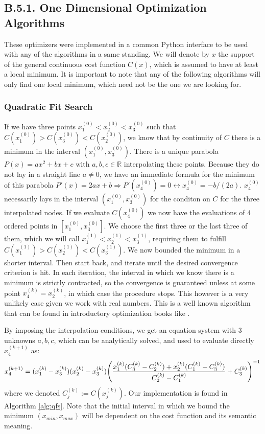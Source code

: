 \documentclass[11pt, a4paper, twoside]{article} %
\newcommand{\R}{\mathbb{R}} %
\begin{document}
\subsection*{B.5.1. One Dimensional Optimization Algorithms}
These optimizers were implemented in a common Python interface to be used with any of the algorithms in a same standing. We will denote by $x$ the support of the general continuous cost function $C(x)$, which is assumed to have at least a local minimum. It is important to note that any of the following algorithms will only find one local minimum, which need not be the one we are looking for.
\subsubsection*{Quadratic Fit Search}\vspace{-0.25cm}
If we have three points $x_1^{(0)}<x_2^{(0)}<x_3^{(0)}$ such that $C(x_1^{(0)})>C(x_3^{(0)})<C(x_2^{(0)})$, we know that by continuity of $C$ there is a minimum in the interval $(x_1^{(0)},x_3^{(0)})$. There is a unique parabola $P(x)=ax^2+bx+c$ with $a,b,c\in\R$ interpolating these points. Because they do not lay in a straight line $a\neq 0$, we have an immediate formula for the minimum of this parabola $P'(x)=2ax+b\Rightarrow P'(x_4^{(0)})=0\leftrightarrow x_4^{(0)}=-b/(2a)$. $x_4^{(0)}$ necessarily lays in the interval $(x_1^{(0)}, x_3^{(0)})$ for the conditon on $C$ for the three interpolated nodes. If we evaluate $C(x_4^{(0)})$ we now have the evaluations of 4 ordered points in $[x_1^{(0)},x_3^{(0)}]$. We choose the first three or the last three of them, which we will call $x_1^{(1)}<x_2^{(1)}< x_3^{(1)}$, requiring them to fulfill $C(x_1^{(1)})>C(x_2^{(1)})< C(x_3^{(1)})$. We now bounded the minimum in a shorter interval. Then start back, and iterate until the desired convergence criterion is hit. In each iteration, the interval in which we know there is a minimum is strictly contracted, so the convergence is guaranteed unless at some point $x_4^{(k)}=x_2^{(k)}$, in which case the procedure stops. This however is a very unlikely case given we work with real numbers. This is a well known algorithm that can be found in introductory optimization books like \cite{opt}. 

By imposing the interpolation conditions, we get an equation system with 3 unknowns $a,b,c$, which can be analytically solved, and used to evaluate directly $x_4^{(k+1)}$ as:\vspace{-0.25cm}
\begin{equation}\label{par}
x_4^{(k+1)}=(x_1^{(k)}-x_3^{(k)})(x_2^{(k)}-x_3^{(k)})\qty(\frac{x_1^{(k)}(C_3^{(k)}-C_2^{(k)})+x_2^{(k)}(C_1^{(k)}-C_3^{(k)})}{C_2^{(k)}-C_1^{(k)}}+C_3^{(k)})^{-1}\vspace{-0.25cm}
\end{equation}
where we denoted $C_j^{(k)}:=C(x_j^{(k)})$. Our implementation is found in Algorithm \ref{alg:qfs}. Note that the initial interval in which we bound the minimum $(x_{min},x_{max})$ will be dependent on the cost function and its semantic meaning.
\end{document}
